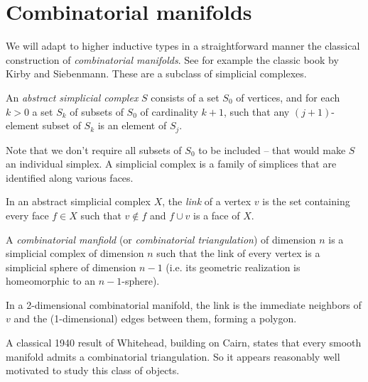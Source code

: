 \section{Combinatorial manifolds}

We will adapt to higher inductive types in a straightforward manner the classical construction of \emph{combinatorial manifolds}. See for example the classic book by Kirby and Siebenmann\cite{kirby_siebenmann}. These are a subclass of simplicial complexes.

\begin{mydef}
An \emph{abstract simplicial complex} \( S \) consists of a set \( S_0 \) of vertices, and for each \( k>0 \) a set \( S_k \) of subsets of \( S_0 \) of cardinality \( k+1 \), such that any \( (j+1) \)-element subset of \( S_k \) is an element of \( S_j \).
\end{mydef}

Note that we don't require all subsets of \( S_0 \) to be included -- that would make \( S \) an individual simplex. A simplicial complex is a family of simplices that are identified along various faces.

\begin{mydef}
In an abstract simplicial complex \( X \), the \emph{link} of a vertex \( v \) is the set containing every face \( f\in X \) such that \( v\notin f \) and \( f\cup v \) is a face of \( X \).
\end{mydef}

\begin{mydef}
A \emph{combinatorial manfiold} (or \emph{combinatorial triangulation}) of dimension \( n \) is a simplicial complex of dimension \( n \) such that the link of every vertex is a simplicial sphere of dimension \( n-1 \) (i.e. its geometric realization is homeomorphic to an \( n-1 \)-sphere).
\end{mydef}

In a 2-dimensional combinatorial manifold, the link is the immediate neighbors of \( v \) and the (1-dimensional) edges between them, forming a polygon.

A classical 1940 result of Whitehead, building on Cairn, states that every smooth manifold admits a combinatorial triangulation\cite{whitehead_triangulation}. So it appears reasonably well motivated to study this class of objects.


